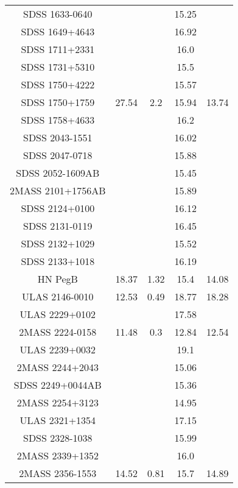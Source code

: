 \begin{table}
\begin{tabular}{ccccc}
SDSS 1633-0640 &  &  & 15.25 &  \\
SDSS 1649+4643 &  &  & 16.92 &  \\
SDSS 1711+2331 &  &  & 16.0 &  \\
SDSS 1731+5310 &  &  & 15.5 &  \\
SDSS 1750+4222 &  &  & 15.57 &  \\
SDSS 1750+1759 & 27.54 & 2.2 & 15.94 & 13.74 \\
SDSS 1758+4633 &  &  & 16.2 &  \\
SDSS 2043-1551 &  &  & 16.02 &  \\
SDSS 2047-0718 &  &  & 15.88 &  \\
SDSS 2052-1609AB &  &  & 15.45 &  \\
2MASS 2101+1756AB &  &  & 15.89 &  \\
SDSS 2124+0100 &  &  & 16.12 &  \\
SDSS 2131-0119 &  &  & 16.45 &  \\
SDSS 2132+1029 &  &  & 15.52 &  \\
SDSS 2133+1018 &  &  & 16.19 &  \\
HN PegB & 18.37 & 1.32 & 15.4 & 14.08 \\
ULAS 2146-0010 & 12.53 & 0.49 & 18.77 & 18.28 \\
ULAS 2229+0102 &  &  & 17.58 &  \\
2MASS 2224-0158 & 11.48 & 0.3 & 12.84 & 12.54 \\
ULAS 2239+0032 &  &  & 19.1 &  \\
2MASS 2244+2043 &  &  & 15.06 &  \\
SDSS 2249+0044AB &  &  & 15.36 &  \\
2MASS 2254+3123 &  &  & 14.95 &  \\
ULAS 2321+1354 &  &  & 17.15 &  \\
SDSS 2328-1038 &  &  & 15.99 &  \\
2MASS 2339+1352 &  &  & 16.0 &  \\
2MASS 2356-1553 & 14.52 & 0.81 & 15.7 & 14.89 \\
\end{tabular}
\end{table}
